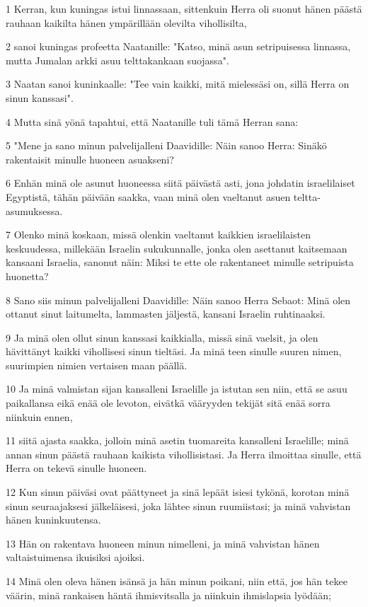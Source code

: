 \par 1 Kerran, kun kuningas istui linnassaan, sittenkuin Herra oli suonut hänen päästä rauhaan kaikilta hänen ympärillään olevilta vihollisilta,
\par 2 sanoi kuningas profeetta Naatanille: "Katso, minä asun setripuisessa linnassa, mutta Jumalan arkki asuu telttakankaan suojassa".
\par 3 Naatan sanoi kuninkaalle: "Tee vain kaikki, mitä mielessäsi on, sillä Herra on sinun kanssasi".
\par 4 Mutta sinä yönä tapahtui, että Naatanille tuli tämä Herran sana:
\par 5 "Mene ja sano minun palvelijalleni Daavidille: Näin sanoo Herra: Sinäkö rakentaisit minulle huoneen asuakseni?
\par 6 Enhän minä ole asunut huoneessa siitä päivästä asti, jona johdatin israelilaiset Egyptistä, tähän päivään saakka, vaan minä olen vaeltanut asuen teltta-asumuksessa.
\par 7 Olenko minä koskaan, missä olenkin vaeltanut kaikkien israelilaisten keskuudessa, millekään Israelin sukukunnalle, jonka olen asettanut kaitsemaan kansaani Israelia, sanonut näin: Miksi te ette ole rakentaneet minulle setripuista huonetta?
\par 8 Sano siis minun palvelijalleni Daavidille: Näin sanoo Herra Sebaot: Minä olen ottanut sinut laitumelta, lammasten jäljestä, kansani Israelin ruhtinaaksi.
\par 9 Ja minä olen ollut sinun kanssasi kaikkialla, missä sinä vaelsit, ja olen hävittänyt kaikki vihollisesi sinun tieltäsi. Ja minä teen sinulle suuren nimen, suurimpien nimien vertaisen maan päällä.
\par 10 Ja minä valmistan sijan kansalleni Israelille ja istutan sen niin, että se asuu paikallansa eikä enää ole levoton, eivätkä vääryyden tekijät sitä enää sorra niinkuin ennen,
\par 11 siitä ajasta saakka, jolloin minä asetin tuomareita kansalleni Israelille; minä annan sinun päästä rauhaan kaikista vihollisistasi. Ja Herra ilmoittaa sinulle, että Herra on tekevä sinulle huoneen.
\par 12 Kun sinun päiväsi ovat päättyneet ja sinä lepäät isiesi tykönä, korotan minä sinun seuraajaksesi jälkeläisesi, joka lähtee sinun ruumiistasi; ja minä vahvistan hänen kuninkuutensa.
\par 13 Hän on rakentava huoneen minun nimelleni, ja minä vahvistan hänen valtaistuimensa ikuisiksi ajoiksi.
\par 14 Minä olen oleva hänen isänsä ja hän minun poikani, niin että, jos hän tekee väärin, minä rankaisen häntä ihmisvitsalla ja niinkuin ihmislapsia lyödään;

